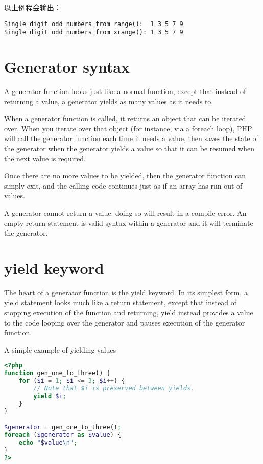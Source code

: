 以上例程会输出：

\begin{verbatim}
Single digit odd numbers from range():  1 3 5 7 9 
Single digit odd numbers from xrange(): 1 3 5 7 9 
\end{verbatim}


\section{Generator syntax}

A generator function looks just like a normal function, except that instead of returning a value, a generator yields as many values as it needs to.

When a generator function is called, it returns an object that can be iterated over. When you iterate over that object (for instance, via a foreach loop), PHP will call the generator function each time it needs a value, then saves the state of the generator when the generator yields a value so that it can be resumed when the next value is required.

Once there are no more values to be yielded, then the generator function can simply exit, and the calling code continues just as if an array has run out of values.

A generator cannot return a value: doing so will result in a compile error. An empty return statement is valid syntax within a generator and it will terminate the generator.


\section{yield keyword}


The heart of a generator function is the yield keyword. In its simplest form, a yield statement looks much like a return statement, except that instead of stopping execution of the function and returning, yield instead provides a value to the code looping over the generator and pauses execution of the generator function.


\begin{example}
A simple example of yielding values
\begin{lstlisting}[language=PHP]
<?php
function gen_one_to_three() {
    for ($i = 1; $i <= 3; $i++) {
        // Note that $i is preserved between yields.
        yield $i;
    }
}

$generator = gen_one_to_three();
foreach ($generator as $value) {
    echo "$value\n";
}
?>
\end{lstlisting}
\end{example}


